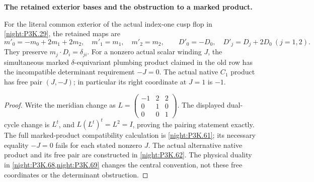 \begin{proposition}\label{iv:correction:P3K.29}
\textbf{The retained exterior bases and the obstruction to a marked product.}\par
For the literal common exterior of the actual index-one
cusp flop in \cref{night:P3K.29}, the retained maps are
\[
 m'_0=-m_0+2m_1+2m_2,\quad m'_1=m_1,\quad m'_2=m_2,
 \qquad D'_0=-D_0,\quad D'_j=D_j+2D_0\ (j=1,2).
\]
They preserve \(m_j\cdot D_i=\delta_{ji}\). For a nonzero actual
scalar winding \(J\), the simultaneous marked
\(\delta\)-equivariant plumbing product claimed in the old row
has the incompatible determinant requirement \(-J=0\).
The actual native \(C_1\) product has free pair \((J,-J)\);
in particular its right coordinate at \(J=1\) is \(-1\).
\end{proposition}
\begin{proof}
Write the meridian change as
\(L=\left(\begin{smallmatrix}-1&2&2\\0&1&0\\0&0&1\end{smallmatrix}\right)\).
The displayed dual-cycle change is \(L^t\), and
\(L(L^t)^t=L^2=I\), proving the pairing statement exactly.
The full marked-product compatibility calculation is
\cref{night:P3K.61}; its necessary equality \(-J=0\) fails for
each stated nonzero \(J\). The actual alternative native product
and its free pair are constructed in \cref{night:P3K.62}.
The physical duality in \cref{night:P3K.68,night:P3K.69} changes
the central convention, not these free coordinates or the
determinant obstruction.
\end{proof}


